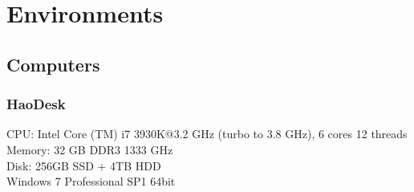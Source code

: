 \section{Environments}

\subsection{Computers}
\subsubsection{HaoDesk}
\label{HaoDesk}

CPU: Intel Core (TM) i7 3930K@3.2 GHz (turbo to 3.8 GHz), 6 cores 12 threads\\
Memory: 32 GB DDR3 1333 GHz\\
Disk: 256GB SSD + 4TB HDD\\ 
Windows 7 Professional SP1 64bit

 

